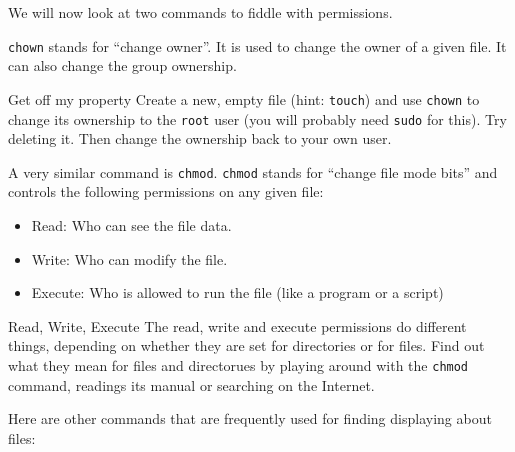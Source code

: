 \documentclass{TheAlternativeCourse}
\begin{document}
We will now look at two commands to fiddle with permissions.

\texttt{chown} stands for ``change owner''. It is used to change the owner of a
given file. It can also change the group ownership.

\begin{exercisebox}{Get off my property}
    Create a new, empty file (hint: \texttt{touch}) and use \texttt{chown} to
    change its ownership to the \texttt{root} user (you will probably need
    \texttt{sudo} for this). Try deleting it. Then change the ownership back to
    your own user.
\end{exercisebox}
%
A very similar command is \texttt{chmod}. \texttt{chmod} stands for ``change
file mode bits'' and controls the following permissions on any given file:

\begin{itemize}
	\item Read: Who can see the file data.
	\item Write: Who can modify the file.
	\item Execute: Who is allowed to run the file (like a program or a script)
\end{itemize}


\begin{exercisebox}{Read, Write, Execute}
	The read, write and execute permissions do different things, depending on whether they are set for directories or for files. Find out what they mean for files and directorues by playing around with the \texttt{chmod} command, readings its manual or searching on the Internet.
\end{exercisebox}
%
Here are other commands that are frequently used for finding displaying about files:
\end{document}
